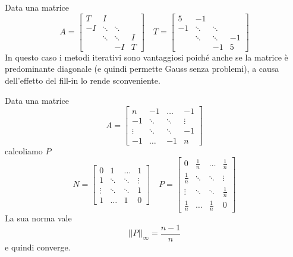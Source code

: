 \begin{example}
	Data una matrice
	\begin{equation*}
		A = \begin{bmatrix}
			T & I & \\ 
			-I & \ddots & \ddots \\
			& \ddots & \ddots & I\\
			& & -I & T
		\end{bmatrix} \quad
		T = \begin{bmatrix}
			5 & -1 & \\ 
			-1 & \ddots & \ddots \\
			& \ddots & \ddots & -1\\
			& & -1 & 5
		\end{bmatrix}
	\end{equation*}
	In questo caso i metodi iterativi sono vantaggiosi poiché anche se la matrice è predominante diagonale (e quindi permette Gauss senza problemi), a causa dell'effetto del fill-in lo rende sconveniente.
\end{example}

\begin{example}
	Data una matrice
	\begin{equation*}
		A = \begin{bmatrix}
			n & -1 & \ldots & -1\\ 
			-1 & \ddots & \ddots & \vdots \\
			\vdots & \ddots & \ddots & -1\\
			-1 & \ldots & -1 & n
		\end{bmatrix}
	\end{equation*}
	calcoliamo $P$
	\begin{equation*}
		N = \begin{bmatrix}
			0 & 1 & \ldots & 1\\ 
			1 & \ddots & \ddots & \vdots \\
			\vdots & \ddots & \ddots & 1\\
			1 & \ldots & 1 & 0
		\end{bmatrix} \quad
		P = \begin{bmatrix}
			0 & \frac{1}{n} & \ldots & \frac{1}{n}\\ 
			\frac{1}{n} & \ddots & \ddots & \vdots \\
			\vdots & \ddots & \ddots & \frac{1}{n}\\
			\frac{1}{n} & \ldots & \frac{1}{n} & 0
		\end{bmatrix}
	\end{equation*}
	La sua norma vale
	\begin{equation*}
		\lvert\lvert P \rvert\rvert_{\infty} = \frac{n-1}{n}
	\end{equation*} e quindi converge.
\end{example}

